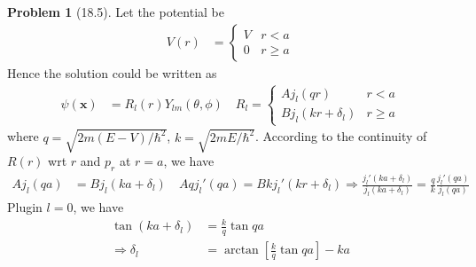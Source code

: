 \documentclass[twoside,11pt]{article}
\theoremstyle{definition}
\newtheorem{problem}{Problem}
\theoremstyle{remark}
\begin{document}
\begin{problem}[18.5]
Let the potential be
\begin{align*}
    V(r) &= \begin{cases}
        V & r < a\\
        0 & r\geq a
    \end{cases}
\end{align*}
Hence the solution could be written as
\begin{align*}
    \psi(\mathbf{x}) &= R_l(r)Y_{lm}(\theta,\phi)\quad
    R_l = \begin{cases}
        Aj_l(qr) & r < a\\
        Bj_l(kr+\delta_l) & r \geq a
    \end{cases}
\end{align*}
where $q=\sqrt{2m(E-V)/\hbar^2}$, $k=\sqrt{2mE/\hbar^2}$.
According to the continuity of $R(r)$ wrt $r$ and $p_r$ at $r=a$, we have
\begin{align*}
    Aj_l(qa) &= Bj_l(ka+\delta_l)\quad 
    Aqj_l'(qa) = Bkj_l'(kr+\delta_l)
    \Rightarrow
    \frac{j_l'(ka+\delta_l)}{j_l(ka+\delta_l)} = 
    \frac{q}{k}\frac{j_l'(qa)}{j_l(qa)}
\end{align*}
Plugin $l=0$, we have
\begin{align*}
    \tan(ka+\delta_l) &= \frac{k}{q}\tan qa\\
    \Rightarrow \delta_l &= 
    \arctan\left[
        \frac{k}{q}\tan qa
    \right] - ka
\end{align*}

\end{problem}





\end{document}
